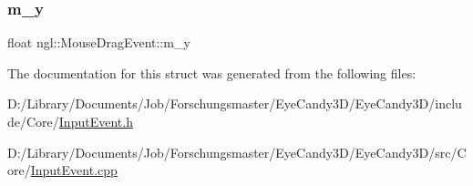 \subsubsection{\texorpdfstring{m\+\_\+y}{m\_y}}
{\footnotesize\ttfamily float ngl\+::\+Mouse\+Drag\+Event\+::m\+\_\+y}



The documentation for this struct was generated from the following files\+:\begin{DoxyCompactItemize}
\item 
D\+:/\+Library/\+Documents/\+Job/\+Forschungsmaster/\+Eye\+Candy3\+D/\+Eye\+Candy3\+D/include/\+Core/\mbox{\hyperlink{_input_event_8h}{Input\+Event.\+h}}\item 
D\+:/\+Library/\+Documents/\+Job/\+Forschungsmaster/\+Eye\+Candy3\+D/\+Eye\+Candy3\+D/src/\+Core/\mbox{\hyperlink{_input_event_8cpp}{Input\+Event.\+cpp}}\end{DoxyCompactItemize}
